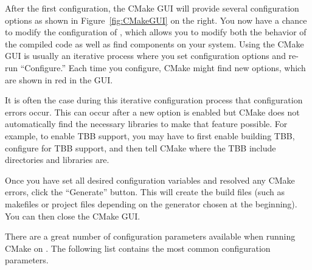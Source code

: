 After the first configuration, the CMake GUI will provide several configuration options as shown in Figure~\ref{fig:CMakeGUI} on the right.
You now have a chance to modify the configuration of \VTKm, which allows you to modify both the behavior of the compiled \VTKm code as well as find components on your system.
Using the CMake GUI is usually an iterative process where you set configuration options and re-run ``Configure.''
Each time you configure, CMake might find new options, which are shown in red in the GUI.

It is often the case during this iterative configuration process that configuration errors occur.
This can occur after a new option is enabled but CMake does not automatically find the necessary libraries to make that feature possible.
For example, to enable TBB support, you may have to first enable building TBB, configure for TBB support, and then tell CMake where the TBB include directories and libraries are.

Once you have set all desired configuration variables and resolved any CMake errors, click the ``Generate'' button. This will create the build files (such as makefiles or project files depending on the generator chosen at the beginning). You can then close the CMake GUI.

There are a great number of configuration parameters available when running CMake on \VTKm.
The following list contains the most common configuration parameters.

